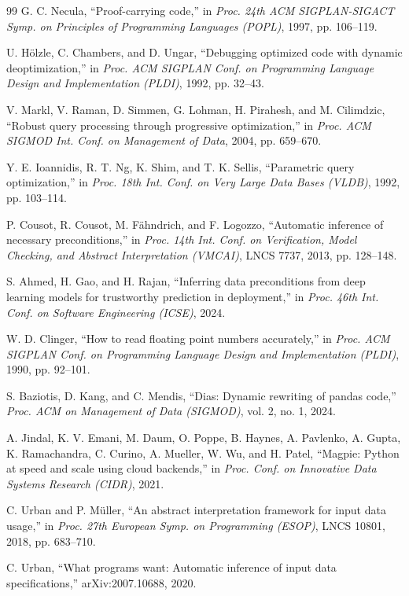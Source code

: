 \begin{thebibliography}{99}
G. C. Necula, ``Proof-carrying code,'' in \emph{Proc. 24th ACM SIGPLAN-SIGACT Symp. on Principles of
Programming Languages (POPL)}, 1997, pp. 106--119.

U. H\"olzle, C. Chambers, and D. Ungar, ``Debugging optimized code with dynamic deoptimization,'' in
\emph{Proc. ACM SIGPLAN Conf. on Programming Language Design and Implementation (PLDI)}, 1992,
pp. 32--43.

V. Markl, V. Raman, D. Simmen, G. Lohman, H. Pirahesh, and M. Cilimdzic, ``Robust query processing
through progressive optimization,'' in \emph{Proc. ACM SIGMOD Int. Conf. on Management of Data},
2004, pp. 659--670.

Y. E. Ioannidis, R. T. Ng, K. Shim, and T. K. Sellis, ``Parametric query optimization,'' in
\emph{Proc. 18th Int. Conf. on Very Large Data Bases (VLDB)}, 1992, pp. 103--114.

P. Cousot, R. Cousot, M. F\"ahndrich, and F. Logozzo, ``Automatic inference of necessary
preconditions,'' in \emph{Proc. 14th Int. Conf. on Verification, Model Checking, and Abstract
Interpretation (VMCAI)}, LNCS 7737, 2013, pp. 128--148.

S. Ahmed, H. Gao, and H. Rajan, ``Inferring data preconditions from deep learning models for
trustworthy prediction in deployment,'' in \emph{Proc. 46th Int. Conf. on Software Engineering
(ICSE)}, 2024.

W. D. Clinger, ``How to read floating point numbers accurately,'' in \emph{Proc. ACM SIGPLAN Conf.
on Programming Language Design and Implementation (PLDI)}, 1990, pp. 92--101.

S. Baziotis, D. Kang, and C. Mendis, ``Dias: Dynamic rewriting of pandas code,'' \emph{Proc. ACM
on Management of Data (SIGMOD)}, vol. 2, no. 1, 2024.

A. Jindal, K. V. Emani, M. Daum, O. Poppe, B. Haynes, A. Pavlenko, A. Gupta, K. Ramachandra,
C. Curino, A. Mueller, W. Wu, and H. Patel, ``Magpie: Python at speed and scale using cloud
backends,'' in \emph{Proc. Conf. on Innovative Data Systems Research (CIDR)}, 2021.

C. Urban and P. M\"uller, ``An abstract interpretation framework for input data usage,'' in
\emph{Proc. 27th European Symp. on Programming (ESOP)}, LNCS 10801, 2018, pp. 683--710.

C. Urban, ``What programs want: Automatic inference of input data specifications,''
arXiv:2007.10688, 2020.


\end{thebibliography}
